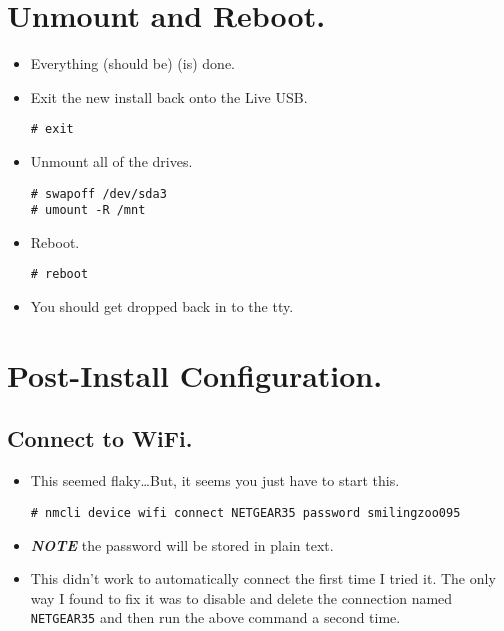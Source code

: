 \documentclass{article}
\begin{document}
\section{Unmount and Reboot.}
  \begin{itemize}
    \item Everything (should be) (is) done.
    \item Exit the new install back onto the Live USB.
\begin{verbatim}
# exit
\end{verbatim}
  \item Unmount all of the drives.
\begin{verbatim}
# swapoff /dev/sda3
# umount -R /mnt
\end{verbatim}
  \item Reboot.
\begin{verbatim}
# reboot
\end{verbatim}
    \item You should get dropped back in to the tty.
  \end{itemize}

\section{Post-Install Configuration.}
  \subsection{Connect to WiFi.}
    \begin{itemize}
      \item This seemed flaky\ldots But, it seems you just have to start this.
\begin{verbatim}
# nmcli device wifi connect NETGEAR35 password smilingzoo095
\end{verbatim}
      \item \textbf{\emph{NOTE}} the password will be stored in plain text.
      \item This didn't work to automatically connect the first time I tried it.
        The only way I found to fix it was to disable and delete the connection
        named \verb|NETGEAR35| and then run the above command a second time.
    \end{itemize}
\end{document}
